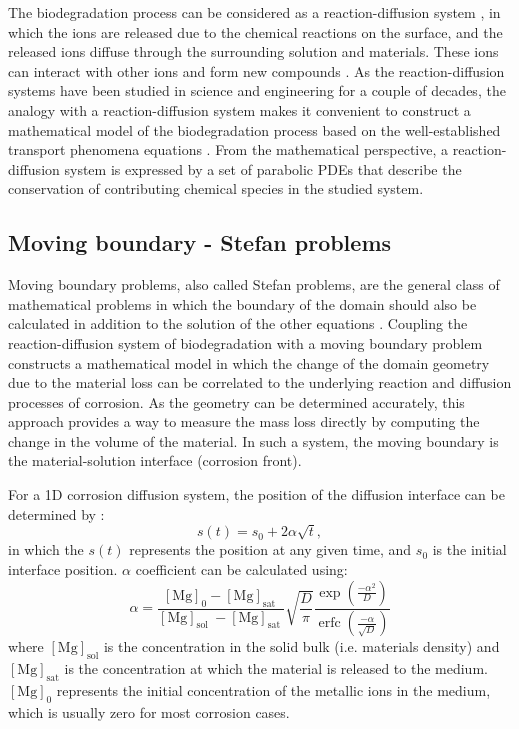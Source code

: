 The biodegradation process can be considered as a reaction-diffusion system \cite{wang2008}, in which the ions are released due to the chemical reactions on the surface, and the released ions diffuse through the surrounding solution and materials. These ions can interact with other ions and form new compounds \cite{Mei2020}. As the reaction-diffusion systems have been studied in science and engineering for a couple of decades, the analogy with a reaction-diffusion system makes it convenient to construct a mathematical model of the biodegradation process based on the well-established transport phenomena equations \cite{Grindrod1996}. From the mathematical perspective, a reaction-diffusion system is expressed by a set of parabolic \gls{PDE}s that describe the conservation of contributing chemical species in the studied system.


\subsection{Moving boundary - Stefan problems}

Moving boundary problems, also called Stefan problems, are the general class of mathematical problems in which the boundary of the domain should also be calculated in addition to the solution of the other equations \cite{Crank1987}. Coupling the reaction-diffusion system of biodegradation with a moving boundary problem constructs a mathematical model in which the change of the domain geometry due to the material loss can be correlated to the underlying reaction and diffusion processes of corrosion. As the geometry can be determined accurately, this approach provides a way to measure the mass loss directly by computing the change in the volume of the material. In such a system, the moving boundary is the material-solution interface (corrosion front).

For a 1D corrosion diffusion system, the position of the diffusion interface can be determined by \cite{Crank1987}:
\begin{equation} \label{eq:stefan}
s(t)=s_{0}+2 \alpha \sqrt{t},
\end{equation}
in which the $s(t)$ represents the position at any given time, and $s_0$ is the initial interface position. $\alpha$ coefficient can be calculated using:
\begin{equation} \label{eq:stefan_alpha}
\alpha=\frac{[\mathrm{Mg}]_{0}-[\mathrm{Mg}]_{\text {sat }}}{[\mathrm{Mg}]_{\text {sol }}-[\mathrm{Mg}]_{\text {sat }}} \sqrt{\frac{D}{\pi}} \frac{\exp \left(\frac{-\alpha^{2}}{D}\right)}{\operatorname{erfc}\left(\frac{-\alpha}{\sqrt{D}}\right)}
\end{equation}
where $[\mathrm{Mg}]_{\text {sol}}$ is the concentration in the solid bulk (i.e. materials density) and $[\mathrm{Mg}]_{\text {sat}}$ is the concentration at which the material is released to the medium. $[\mathrm{Mg}]_{0}$ represents the initial concentration of the metallic ions in the medium, which is usually zero for most corrosion cases.

